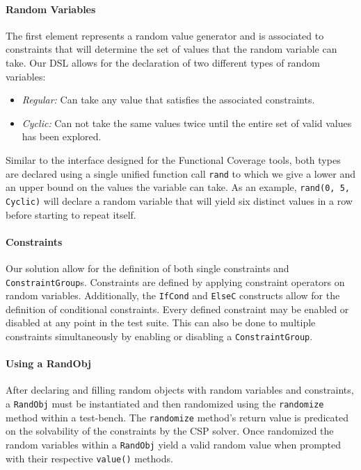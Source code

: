 \documentclass[conference]{IEEEtran}
\begin{document}
\paragraph{Random Variables} The first element represents a random value generator and is associated to constraints that will determine the set of values that the random variable can take.
Our DSL allows for the declaration of two different types of random variables: 
\begin{itemize}
	\item \emph{Regular:} Can take any value that satisfies the associated constraints.
	\item \emph{Cyclic:} Can not take the same values twice until the entire set of valid values has been explored.
\end{itemize}
Similar to the interface designed for the Functional Coverage tools, both types are declared using a single unified function call \texttt{rand} to which we give a lower and an upper bound on the values the variable can take.
As an example, \texttt{rand(0, 5, Cyclic)} will declare a random variable that will yield six distinct values in a row before starting to repeat itself.

\paragraph{Constraints} Our solution allow for the definition of both single constraints and \texttt{ConstraintGroup}s. 
Constraints are defined by applying constraint operators on random variables.
Additionally, the \texttt{IfCond} and \texttt{ElseC} constructs allow for the definition of conditional constraints.
Every defined constraint may be enabled or disabled at any point in the test suite. 
This can also be done to multiple constraints simultaneously by enabling or disabling a  \texttt{ConstraintGroup}.

\paragraph{Using a RandObj} After declaring and filling random objects with random variables and constraints, a \texttt{RandObj} must be instantiated and then randomized using the \texttt{randomize} method within a test-bench.
The \texttt{randomize} method's return value is predicated on the solvability of the constraints by the CSP solver. 
Once randomized the random variables within a \texttt{RandObj} yield a valid random value when prompted with their respective \texttt{value()} methods.
\end{document}
